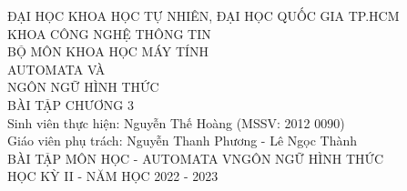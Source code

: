 \documentclass[12pt, a4paper]{article}
\begin{document}
	

	\begin{titlepage}
		\centering
		\large
		ĐẠI HỌC KHOA HỌC TỰ NHIÊN, ĐẠI HỌC QUỐC GIA TP.HCM\\[.1in]
		KHOA CÔNG NGHỆ THÔNG TIN\\BỘ MÔN KHOA HỌC MÁY TÍNH\\
		\vfill
		\huge AUTOMATA VÀ\\NGÔN NGỮ HÌNH THỨC\\[.1in]
		\LARGE BÀI TẬP CHƯƠNG 3\\
		\vfill
		\RaggedRight
		\large
		Sinh viên thực hiện: Nguyễn Thế Hoàng (MSSV: 2012 0090)\\[.1in]
		Giáo viên phụ trách: Nguyễn Thanh Phương - Lê Ngọc Thành\\[.2in]
		\Centering
		BÀI TẬP MÔN HỌC - AUTOMATA VNGÔN NGỮ HÌNH THỨC\\[.1in]
		HỌC KỲ II - NĂM HỌC 2022 - 2023
	\end{titlepage}
	
	\newpage	
	
	
	
\end{document}
